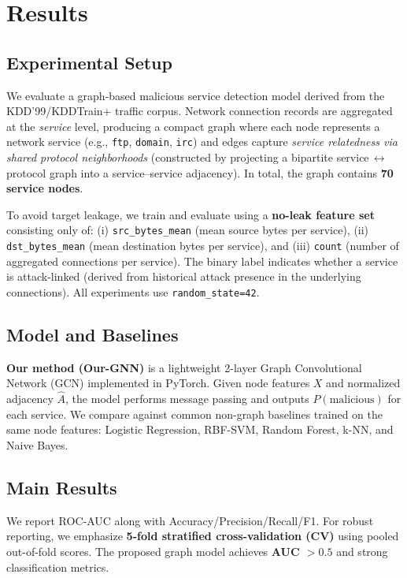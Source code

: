 
\section{Results}
\subsection{Experimental Setup}
We evaluate a graph-based malicious service detection model derived from the KDD’99/KDDTrain+ traffic corpus. Network connection records are aggregated at the \emph{service} level, producing a compact graph where each node represents a network service (e.g., \texttt{ftp}, \texttt{domain}, \texttt{irc}) and edges capture \emph{service relatedness via shared protocol neighborhoods} (constructed by projecting a bipartite service\,$\leftrightarrow$\,protocol graph into a service--service adjacency). In total, the graph contains \textbf{70 service nodes}.

To avoid target leakage, we train and evaluate using a \textbf{no-leak feature set} consisting only of: (i) \texttt{src\_bytes\_mean} (mean source bytes per service), (ii) \texttt{dst\_bytes\_mean} (mean destination bytes per service), and (iii) \texttt{count} (number of aggregated connections per service). The binary label indicates whether a service is attack-linked (derived from historical attack presence in the underlying connections). All experiments use \texttt{random\_state=42}.

\subsection{Model and Baselines}
\textbf{Our method (Our-GNN)} is a lightweight 2-layer Graph Convolutional Network (GCN) implemented in PyTorch. Given node features $X$ and normalized adjacency $\hat{A}$, the model performs message passing and outputs $P(\mathrm{malicious})$ for each service. We compare against common non-graph baselines trained on the same node features: Logistic Regression, RBF-SVM, Random Forest, k-NN, and Naive Bayes.

\subsection{Main Results}
We report ROC-AUC along with Accuracy/Precision/Recall/F1. For robust reporting, we emphasize \textbf{5-fold stratified cross-validation (CV)} using pooled out-of-fold scores. The proposed graph model achieves \textbf{AUC $> 0.5$} and strong classification metrics.

